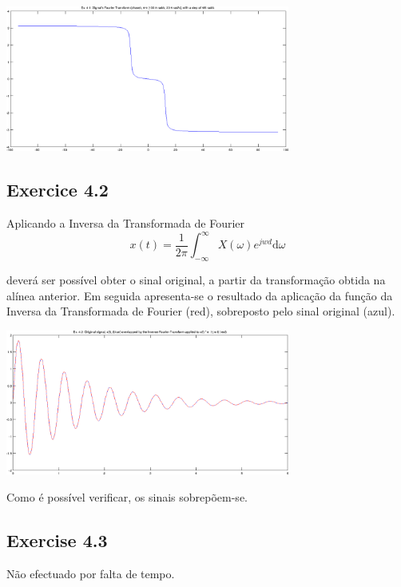 \documentclass[a4paper]{article}
\begin{document}
\begin{center}
	\includegraphics[width=0.70\textwidth]{images/ex_4_1_pha.png}
	\label{fig:ex_4_1_phase}
\end{center}

\subsection{Exercice 4.2}
\noindent Aplicando a Inversa da Transformada de Fourier
\begin{equation}
	x(t) = \dfrac{1}{2\pi} \int_{-\infty}^{\infty} X (\omega) e^{jwd} \mathrm{d} \omega
\end{equation}

\noindent deverá ser possível obter o sinal original, a partir da transformação obtida na alínea anterior. Em seguida apresenta-se o resultado da aplicação da função da Inversa da Transformada de Fourier (red), sobreposto pelo sinal original (azul).
\begin{center}
	\includegraphics[width=0.70\textwidth]{images/ex_4_2.png}
	\label{fig:ex_4_2}
\end{center}

\noindent Como é possível verificar, os sinais sobrepõem-se.

\subsection{Exercise 4.3}
\noindent Não efectuado por falta de tempo.
\end{document}
